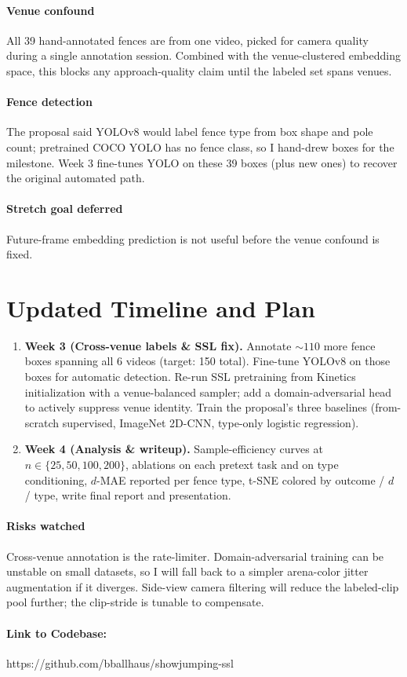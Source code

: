 \documentclass[11pt]{article}
\begin{document}
\paragraph{Venue confound} All 39 hand-annotated fences are from one video, picked for camera quality during a single annotation session. Combined with the venue-clustered embedding space, this blocks any approach-quality claim until the labeled set spans venues.

\paragraph{Fence detection} The proposal said YOLOv8 would label fence type from box shape and pole count; pretrained COCO YOLO has no fence class, so I hand-drew boxes for the milestone. Week 3 fine-tunes YOLO on these 39 boxes (plus new ones) to recover the original automated path.

\paragraph{Stretch goal deferred} Future-frame embedding prediction is not useful before the venue confound is fixed.

\section{Updated Timeline and Plan}

\begin{enumerate}
  \item \textbf{Week 3 (Cross-venue labels \& SSL fix).} Annotate $\sim 110$ more fence boxes spanning all 6 videos (target: 150 total). Fine-tune YOLOv8 on those boxes for automatic detection. Re-run SSL pretraining from Kinetics initialization with a venue-balanced sampler; add a domain-adversarial head to actively suppress venue identity. Train the proposal's three baselines (from-scratch supervised, ImageNet 2D-CNN, type-only logistic regression).
  \item \textbf{Week 4 (Analysis \& writeup).} Sample-efficiency curves at $n \in \{25, 50, 100, 200\}$, ablations on each pretext task and on type conditioning, $d$-MAE reported per fence type, t-SNE colored by outcome / $d$ / type, write final report and presentation. 
\end{enumerate}

\paragraph{Risks watched} Cross-venue annotation is the rate-limiter. Domain-adversarial training can be unstable on small datasets, so I will fall back to a simpler arena-color jitter augmentation if it diverges. Side-view camera filtering will reduce the labeled-clip pool further; the clip-stride is tunable to compensate.

\paragraph{Link to Codebase:} https://github.com/bballhaus/showjumping-ssl
\end{document}
